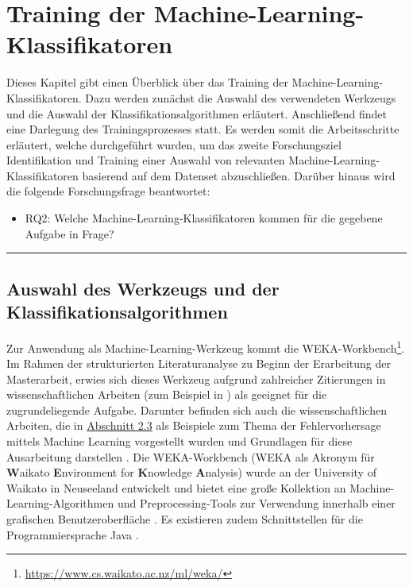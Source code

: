 
\chapter{Training der Machine-Learning-Klassifikatoren}
\label{training}

Dieses Kapitel gibt einen Überblick über das Training der Machine-Learning-Klassifikatoren. Dazu werden zunächst die Auswahl des verwendeten Werkzeugs und die Auswahl der Klassifikationsalgorithmen erläutert. Anschließend findet eine Darlegung des Trainingsprozesses statt. Es werden somit die Arbeitsschritte erläutert, welche durchgeführt wurden, um das zweite Forschungsziel \glqq Identifikation und Training einer Auswahl von relevanten Machine-Learning-Klassifikatoren basierend auf dem Datenset\grqq{} abzuschließen. Darüber hinaus wird die folgende Forschungsfrage beantwortet:
\vspace{-\topsep}
\begin{itemize}
\setlength{\itemsep}{-2pt}
\item RQ2: Welche Machine-Learning-Klassifikatoren kommen für die gegebene Aufgabe in
Frage?
\end{itemize}
\smallskip
\hrule

\section{Auswahl des Werkzeugs und der Klassifikationsalgorithmen}

Zur Anwendung als Machine-Learning-Werkzeug kommt die WEKA-Workbench\footnote{\href{https://www.cs.waikato.ac.nz/ml/weka/}{https://www.cs.waikato.ac.nz/ml/weka/}}. Im Rahmen der strukturierten Literaturanalyse zu Beginn der Erarbeitung der Masterarbeit, erwies sich dieses Werkzeug aufgrund zahlreicher Zitierungen in wissenschaftlichen Arbeiten (zum Beispiel in \cite{Hammouri2018,Ratzinger2008}) als geeignet für die zugrundeliegende Aufgabe. Darunter befinden sich auch die wissenschaftlichen Arbeiten, die in \hyperref[ml-background]{Abschnitt 2.3} als Beispiele zum Thema der Fehlervorhersage mittels Machine Learning vorgestellt wurden und Grundlagen für diese Ausarbeitung darstellen \cite{Moser2008,Queiroz2016}. Die WEKA-Workbench (WEKA als Akronym für \textbf{W}aikato \textbf{E}nvironment for \textbf{K}nowledge \textbf{A}nalysis) wurde an der University of Waikato in Neuseeland entwickelt und bietet eine große Kollektion an Machine-Learning-Algorithmen und Preprocessing-Tools zur Verwendung innerhalb einer grafischen Benutzeroberfläche \cite{Weka2016}. Es existieren zudem Schnittstellen für die Programmiersprache Java \cite{Weka2016}.

